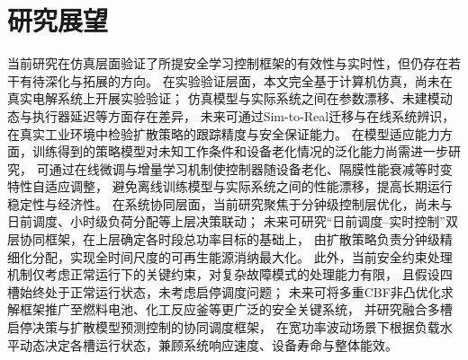 \section{研究展望}

当前研究在仿真层面验证了所提安全学习控制框架的有效性与实时性，但仍存在若干有待深化与拓展的方向。
在实验验证层面，本文完全基于计算机仿真，尚未在真实电解系统上开展实验验证；
仿真模型与实际系统之间在参数漂移、未建模动态与执行器延迟等方面存在差异，
未来可通过Sim-to-Real迁移与在线系统辨识，在真实工业环境中检验扩散策略的跟踪精度与安全保证能力。
在模型适应能力方面，训练得到的策略模型对未知工作条件和设备老化情况的泛化能力尚需进一步研究，
可通过在线微调与增量学习机制使控制器随设备老化、隔膜性能衰减等时变特性自适应调整，
避免离线训练模型与实际系统之间的性能漂移，提高长期运行稳定性与经济性。
在系统协同层面，当前研究聚焦于分钟级控制层优化，尚未与日前调度、小时级负荷分配等上层决策联动；
未来可研究``日前调度--实时控制''双层协同框架，在上层确定各时段总功率目标的基础上，
由扩散策略负责分钟级精细化分配，实现全时间尺度的可再生能源消纳最大化。
此外，当前安全约束处理机制仅考虑正常运行下的关键约束，对复杂故障模式的处理能力有限，
且假设四槽始终处于正常运行状态，未考虑启停调度问题；
未来可将多重CBF非凸优化求解框架推广至燃料电池、化工反应釜等更广泛的安全关键系统，
并研究融合多槽启停决策与扩散模型预测控制的协同调度框架，
在宽功率波动场景下根据负载水平动态决定各槽运行状态，兼顾系统响应速度、设备寿命与整体能效。

